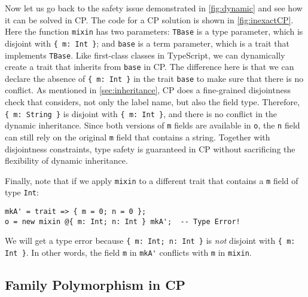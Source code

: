Now let us go back to the safety issue demonstrated in \autoref{fig:dynamic} and
see how it can be solved in CP. The code for a CP solution is shown in
\autoref{fig:inexactCP}. Here the function \lstinline{mixin} has two parameters:
\lstinline{TBase} is a type parameter, which is disjoint with
\lstinline|{ m: Int }|; and \lstinline{base} is a term parameter, which is a
trait that implements \lstinline{TBase}. Like first-class classes in TypeScript,
we can dynamically create a trait that inherits from \lstinline{base} in CP. The
difference here is that we can declare the absence of \lstinline|{ m: Int }| in
the trait \lstinline{base} to make sure that there is no conflict. As mentioned
in \autoref{sec:inheritance}, CP does a fine-grained disjointness check that
considers, not only the label name, but also the field type. Therefore,
\lstinline|{ m: String }| is disjoint with \lstinline|{ m: Int }|, and there is
no conflict in the dynamic inheritance. Since both versions of \lstinline{m}
fields are available in \lstinline{o}, the \lstinline{n} field can still rely on
the original \lstinline{m} field that contains a string. Together with
disjointness constraints, type safety is guaranteed in CP without sacrificing
the flexibility of dynamic inheritance.

Finally, note that if we apply \lstinline{mixin} to a different trait that
contains a \lstinline{m} field of type \lstinline{Int}:
\begin{lstlisting}
mkA' = trait => { m = 0; n = 0 };
o = new mixin @{ m: Int; n: Int } mkA';  -- Type Error!
\end{lstlisting}
We will get a type error because \lstinline|{ m: Int; n: Int }| is \emph{not}
disjoint with \lstinline|{ m: Int }|. In other words, the field \lstinline{m} in
\lstinline{mkA'} conflicts with \lstinline{m} in \lstinline{mixin}.


\subsection{Family Polymorphism in CP} \label{sec:ep}

